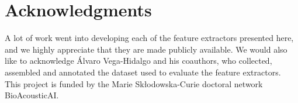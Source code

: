 \documentclass[11pt]{article}
\begin{document}
%













\section{Acknowledgments}
A lot of work went into developing each of the feature extractors presented here, and we highly appreciate that they are made publicly available.
We would also like to acknowledge Álvaro Vega-Hidalgo and his coauthors, who collected, assembled and annotated the dataset used to evaluate the feature extractors. 
This project is funded by the Marie Skłodowska-Curie doctoral network BioAcousticAI.
% 

\end{document}
